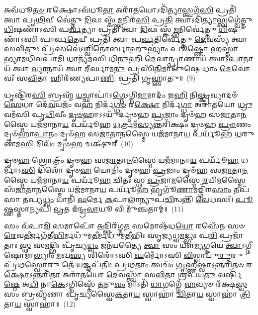 {\anuvakamend[{\-\ul{𑌤𑍍𑌵𑌾} \ul{𑌭𑌾}\-𑌗 𑌏𑌕𑌾᳴\-𑌦𑌶 𑌚}]}

𑌅𑌵᳴𑌧𑍂\-\ul{𑌤}\-\-\ul{𑍞} 𑌰𑌕𑍍𑌷𑍋\-𑌽𑌵᳴𑌧𑍂\-\ul{𑌤𑌾} 𑌅𑌰𑌾᳴\-\ul{𑌤}\-𑌯𑍋\-𑌽𑌦𑌿᳴\-\ul{𑌤𑍍𑌯𑌾}\-𑌸𑍍𑌤𑍍𑌵𑌗᳴\-\ul{𑌸𑌿} 𑌪𑍍𑌰𑌤𑌿᳴ 𑌤𑍍𑌵𑌾 𑌪𑍃\-\ul{𑌥𑌿}\-𑌵𑍀 𑌵𑍇॑𑌤𑍍𑌤𑍁 \ul{𑌦𑌿}\-𑌵𑌃 𑌸𑍍𑌕᳴\-\ul{𑌮𑍍𑌭}\-𑌨𑌿𑌰᳴\-\ul{𑌸𑌿} 𑌪𑍍𑌰\-\ul{𑌤𑌿} 𑌤𑍍𑌵𑌾\-𑌽𑌦𑌿᳴\-\ul{𑌤𑍍𑌯𑌾}\-𑌸𑍍𑌤𑍍𑌵𑌗𑍍𑌵𑍇॑𑌤𑍍𑌤𑍁 \ul{𑌧𑌿}\-𑌷𑌣𑌾᳴\-𑌽𑌸𑌿 𑌪\-\ul{𑌰𑍍𑌵}\-𑌤𑍍𑌯𑌾 𑌪𑍍𑌰𑌤𑌿᳴ 𑌤𑍍𑌵𑌾 \ul{𑌦𑌿}\-𑌵𑌃 𑌸𑍍𑌕᳴\-\ul{𑌮𑍍𑌭}\-𑌨𑌿𑌰𑍍𑌵𑍇॑𑌤𑍍𑌤𑍁 \ul{𑌧𑌿}\-𑌷𑌣𑌾᳴\-𑌽𑌸𑌿 𑌪𑌾𑌰𑍍𑌵\-\ul{𑌤𑍇}\-𑌯𑍀 𑌪𑍍𑌰𑌤𑌿᳴ 𑌤𑍍𑌵𑌾 𑌪\-\ul{𑌰𑍍𑌵}\-𑌤𑌿𑌰𑍍𑌵𑍇॑𑌤𑍍𑌤𑍁 \ul{𑌦𑍇}\-𑌵𑌸𑍍𑌯᳴ 𑌤𑍍𑌵𑌾 𑌸\-\ul{𑌵𑌿}\-𑌤𑍁𑌃 𑌪𑍍𑌰᳴\-\ul{𑌸}\-𑌵𑍇॑\-𑌽𑌶𑍍𑌵𑌿𑌨𑍋॑\-\ul{𑌰𑍍𑌬𑌾}\-𑌹𑍁\-𑌭𑍍𑌯𑌾𑌂॑ \ul{𑌪𑍂}\-𑌷𑍍𑌣𑍋 𑌹𑌸𑍍𑌤𑌾॑\-\ul{𑌭𑍍𑌯𑌾}\-𑌮𑌧𑌿᳴𑌵𑌪𑌾𑌮𑌿 \ul{𑌧𑌾}\-𑌨𑍍𑌯᳴𑌮𑌸𑌿 𑌧𑌿\-\ul{𑌨𑍁}\-𑌹𑌿 \ul{𑌦𑍇}\-𑌵𑌾\-\ul{𑌨𑍍𑌪𑍍𑌰𑌾}\-𑌣𑌾𑌯᳴ 𑌤𑍍𑌵𑌾\-𑌽\-\ul{𑌪𑌾}\-𑌨𑌾𑌯᳴ 𑌤𑍍𑌵𑌾 \ul{𑌵𑍍𑌯𑌾}\-𑌨𑌾𑌯᳴ 𑌤𑍍𑌵𑌾 \ul{𑌦𑍀}\-𑌰𑍍𑌘𑌾𑌮\-\ul{𑌨𑍁} 𑌪𑍍𑌰𑌸𑌿᳴\-\ul{𑌤𑌿}\-𑌮𑌾𑌯𑍁᳴𑌷𑍇 𑌧𑌾𑌂 \ul{𑌦𑍇}\-𑌵𑍋 𑌵𑌃᳴ 𑌸\-\ul{𑌵𑌿}\-𑌤𑌾 𑌹𑌿𑌰᳴𑌣𑍍𑌯𑌪𑌾\-\ul{𑌣𑌿}\-: 𑌪𑍍𑌰𑌤𑌿᳴ 𑌗𑍃𑌹𑍍𑌣𑌾𑌤𑍁॥~(9)

{\anuvakamend[{\-\ul{𑌪𑍍𑌰𑌾}\-𑌣𑌾𑌯᳴ \ul{𑌤𑍍𑌵𑌾} 𑌪𑌞𑍍𑌚᳴𑌦𑌶 𑌚}]}

𑌧𑍃𑌷𑍍𑌟𑌿᳴𑌰\-\ul{𑌸𑌿} 𑌬𑍍𑌰𑌹𑍍𑌮᳴ \ul{𑌯}\-𑌚𑍍𑌛𑌾𑌪𑌾॑\-𑌽\-\ul{𑌗𑍍𑌨𑍇}\-\-𑌽𑌗𑍍𑌨𑌿\-\ul{𑌮𑌾}\-𑌮𑌾𑌦𑌂᳴ 𑌜\-\ul{𑌹𑌿} 𑌨𑌿\-\ul{𑌷𑍍𑌕𑍍𑌰}\-𑌵𑍍𑌯𑌾𑌦𑍞᳴ \ul{𑌸𑍇}\-𑌧𑌾 𑌦𑍇᳴\-\ul{𑌵}\-𑌯𑌜𑌂᳴ 𑌵\-\ul{𑌹} 𑌨𑌿𑌰𑍍𑌦᳴\-\ul{𑌗𑍍𑌧}\-\-\ul{𑍞} 𑌰\-\ul{𑌕𑍍𑌷𑍋} 𑌨𑌿𑌰𑍍𑌦᳴\-\ul{𑌗𑍍𑌧𑌾} 𑌅𑌰𑌾᳴𑌤𑌯𑍋 \ul{𑌧𑍍𑌰𑍁}\-𑌵𑌮᳴𑌸𑌿 𑌪𑍃\-\ul{𑌥𑌿}\-𑌵𑍀𑌂 \ul{𑌦𑍃}\-\-\ul{𑍞}\-𑌹𑌾𑌽𑌽𑌯𑍁᳴𑌰𑍍𑌦𑍃𑍞𑌹 \ul{𑌪𑍍𑌰}\-𑌜𑌾𑌂 𑌦𑍃𑍞᳴𑌹 𑌸\-\ul{𑌜𑌾}\-𑌤𑌾\-\ul{𑌨}\-𑌸𑍍𑌮𑍈 𑌯𑌜᳴𑌮𑌾𑌨𑌾\-\ul{𑌯} 𑌪𑌰𑍍𑌯𑍂᳴𑌹 \ul{𑌧}\-𑌰𑍍𑌤𑍍𑌰𑌮᳴\-\ul{𑌸𑍍𑌯}\-𑌨𑍍𑌤𑌰𑌿᳴𑌕𑍍𑌷𑌂 𑌦𑍃𑍞𑌹 \ul{𑌪𑍍𑌰𑌾}\-𑌣𑌂 𑌦𑍃𑍞᳴𑌹𑌾\-\ul{𑌪𑌾}\-𑌨𑌂 𑌦𑍃𑍞᳴𑌹 𑌸\-\ul{𑌜𑌾}\-𑌤𑌾\-\-\ul{𑌨}\-𑌸𑍍𑌮𑍈 𑌯𑌜᳴𑌮𑌾𑌨𑌾\-\ul{𑌯} 𑌪𑌰𑍍𑌯𑍂᳴𑌹 \ul{𑌧}\-𑌰𑍁𑌣᳴𑌮\-\ul{𑌸𑌿} 𑌦𑌿𑌵𑌂᳴ 𑌦𑍃𑍞\-\ul{𑌹} 𑌚𑌕𑍍𑌷𑍁᳴𑌰𑍍~(10)

𑌦𑍃𑍞\-\ul{𑌹} 𑌶𑍍𑌰𑍋𑌤𑍍𑌰𑌂᳴ 𑌦𑍃𑍞𑌹 𑌸\-\ul{𑌜𑌾}\-𑌤𑌾\-\ul{𑌨}\-𑌸𑍍𑌮𑍈 𑌯𑌜᳴𑌮𑌾𑌨𑌾\-\ul{𑌯} 𑌪𑌰𑍍𑌯𑍂᳴\-\ul{𑌹} 𑌧𑌰𑍍𑌮𑌾᳴\-𑌽\-\ul{𑌸𑌿} 𑌦𑌿𑌶𑍋᳴ 𑌦𑍃𑍞\-\ul{𑌹} 𑌯𑍋𑌨𑌿𑌂᳴ 𑌦𑍃𑍞𑌹 \ul{𑌪𑍍𑌰}\-𑌜𑌾𑌂 𑌦𑍃𑍞᳴𑌹 𑌸\-\ul{𑌜𑌾}\-𑌤𑌾\-\ul{𑌨}\-𑌸𑍍𑌮𑍈 𑌯𑌜᳴𑌮𑌾𑌨𑌾\-\ul{𑌯} 𑌪𑌰𑍍𑌯𑍂᳴\-\ul{𑌹} 𑌚𑌿𑌤𑌃᳴ 𑌸𑍍𑌥 \ul{𑌪𑍍𑌰}\-𑌜𑌾\-\ul{𑌮}\-𑌸𑍍𑌮𑍈 \ul{𑌰}\-𑌯𑌿\-\ul{𑌮}\-𑌸𑍍𑌮𑍈 𑌸᳴\-\ul{𑌜𑌾}\-𑌤𑌾\-\ul{𑌨}\-𑌸𑍍𑌮𑍈 𑌯𑌜᳴𑌮𑌾𑌨𑌾\-\ul{𑌯} 𑌪𑌰𑍍𑌯𑍂᳴\-\ul{𑌹} 𑌭𑍃𑌗𑍂᳴\-\ul{𑌣𑌾}\-𑌮𑌙𑍍𑌗𑌿᳴𑌰\-\ul{𑌸𑌾𑌂} 𑌤𑌪᳴𑌸𑌾 𑌤𑌪𑍍𑌯\-\ul{𑌧𑍍𑌵𑌂} 𑌯𑌾𑌨𑌿᳴ \ul{𑌘}\-𑌰𑍍𑌮𑍇 \ul{𑌕}\-𑌪𑌾𑌲𑌾॑𑌨𑍍𑌯𑍁𑌪\-\ul{𑌚𑌿}\-𑌨𑍍𑌵𑌨𑍍𑌤𑌿᳴ \ul{𑌵𑍇}\-𑌧𑌸𑌃᳴। \ul{𑌪𑍂}\-𑌷𑍍𑌣𑌸𑍍𑌤𑌾𑌨𑍍𑌯𑌪𑌿᳴ \ul{𑌵𑍍𑌰}\-𑌤 𑌇᳴𑌨𑍍𑌦𑍍𑌰\-\ul{𑌵𑌾}\-𑌯𑍂 𑌵𑌿 𑌮𑍁᳴𑌞𑍍𑌚𑌤𑌾𑌮𑍍॥~(11)

{\anuvakamend[{𑌚𑌕𑍍𑌷𑍁᳴\-\ul{𑌰}\-𑌷𑍍𑌟𑌾𑌚᳴𑌤𑍍𑌵𑌾𑌰𑌿𑍞𑌶𑌚𑍍𑌚}]}

𑌸𑌂 𑌵᳴𑌪𑌾\-\ul{𑌮𑌿} 𑌸𑌮𑌾𑌪𑍋᳴ \ul{𑌅}\-𑌦𑍍𑌭𑌿𑌰᳴𑌗𑍍𑌮\-\ul{𑌤} 𑌸𑌮𑍋𑌷᳴𑌧\-\ul{𑌯𑍋} 𑌰𑌸𑍇᳴\-\ul{𑌨} 𑌸𑍞 \ul{𑌰𑍇}\-𑌵\-\ul{𑌤𑍀}\-𑌰𑍍𑌜𑌗᳴𑌤𑍀\-\ul{𑌭𑌿}\-𑌰𑍍𑌮𑌧𑍁᳴𑌮\-\ul{𑌤𑍀}\-𑌰𑍍𑌮𑌧𑍁᳴𑌮𑌤𑍀𑌭𑌿𑌃 𑌸𑍃𑌜𑍍𑌯𑌧𑍍𑌵\-\ul{𑌮}\-𑌦𑍍𑌭𑍍𑌯𑌃 𑌪\-\ul{𑌰𑌿} 𑌪𑍍𑌰𑌜𑌾᳴𑌤𑌾𑌃 \ul{𑌸𑍍𑌥} 𑌸\-\ul{𑌮}\-𑌦𑍍𑌭𑌿𑌃 𑌪𑍃᳴𑌚𑍍𑌯\-\ul{𑌧𑍍𑌵𑌂} 𑌜𑌨᳴𑌯𑌤𑍍𑌯𑍈 \ul{𑌤𑍍𑌵𑌾} 𑌸𑌂 𑌯𑍗॑\-\ul{𑌮𑍍𑌯}\-𑌗𑍍𑌨𑌯𑍇॑ \ul{𑌤𑍍𑌵𑌾}\-\-𑌽𑌗𑍍𑌨𑍀𑌷𑍋𑌮𑌾॑𑌭𑍍𑌯𑌾𑌂 \ul{𑌮}\-𑌖\-\ul{𑌸𑍍𑌯} 𑌶𑌿𑌰𑍋᳴\-𑌽𑌸𑌿 \ul{𑌘}\-𑌰𑍍𑌮𑍋᳴\-𑌽𑌸𑌿 \ul{𑌵𑌿}\-𑌶𑍍𑌵𑌾𑌯𑍁᳴\-\ul{𑌰𑍁}\-𑌰𑍁 𑌪𑍍𑌰᳴𑌥\-\ul{𑌸𑍍𑌵𑍋}\-𑌰𑍁 𑌤𑍇᳴ \ul{𑌯}\-𑌜𑍍𑌞𑌪᳴𑌤𑌿𑌃 𑌪𑍍𑌰𑌥\-\ul{𑌤𑌾𑌂} 𑌤𑍍𑌵𑌚𑌂᳴ 𑌗𑍃𑌹𑍍𑌣𑍀\-\ul{𑌷𑍍𑌵𑌾}\-\-𑌽𑌨𑍍𑌤𑌰𑌿᳴\-\ul{𑌤}\-\-\ul{𑍞} 𑌰\-\ul{𑌕𑍍𑌷𑍋}\-\-𑌽𑌨𑍍𑌤𑌰𑌿᳴\-\ul{𑌤𑌾} 𑌅𑌰𑌾᳴𑌤𑌯𑍋 \ul{𑌦𑍇}\-𑌵𑌸𑍍𑌤𑍍𑌵𑌾᳴ 𑌸\-\ul{𑌵𑌿}\-𑌤𑌾 𑌶𑍍𑌰᳴𑌪𑌯\-\ul{𑌤𑍁} 𑌵𑌰𑍍\mbox{}𑌷𑌿᳴\-\ul{𑌷𑍍𑌠𑍇} 𑌅\-\ul{𑌧𑌿} 𑌨𑌾\-\ul{𑌕𑍇}\-\-𑌽𑌗𑍍𑌨𑌿𑌸𑍍𑌤𑍇᳴ \ul{𑌤}\-𑌨𑍁\-\ul{𑌵𑌂} 𑌮𑌾\-𑌽𑌤𑌿᳴ \ul{𑌧𑌾}\-𑌗𑌗𑍍𑌨𑍇᳴ \ul{𑌹}\-𑌵𑍍𑌯𑍞 𑌰᳴𑌕𑍍𑌷\-\ul{𑌸𑍍𑌵} 𑌸𑌂 𑌬𑍍𑌰𑌹𑍍𑌮᳴𑌣𑌾 𑌪𑍃𑌚𑍍𑌯𑌸𑍍𑌵𑍈\-\ul{𑌕}\-𑌤𑌾\-\ul{𑌯} 𑌸𑍍𑌵𑌾𑌹𑌾॑ \ul{𑌦𑍍𑌵𑌿}\-𑌤𑌾\-\ul{𑌯} 𑌸𑍍𑌵𑌾𑌹𑌾॑ \ul{𑌤𑍍𑌰𑌿}\-𑌤𑌾\-\ul{𑌯} 𑌸𑍍𑌵𑌾𑌹𑌾॑॥~(12)

